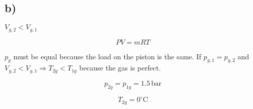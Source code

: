 

\subsection*{b)}
$V_{g,2} < V_{g,1}$

\[
PV = mRT
\]

$p_{g}$ must be equal because the load on the piston is the same. If $p_{g,1} = p_{g,2}$ and $V_{g,2} < V_{g,1} \Rightarrow T_{2g} < T_{1g}$ because the gas is perfect.

\[
p_{2g} = p_{1g} = 1.5 \, \text{bar}
\]

\[
T_{2g} = 0^\circ \text{C}
\]